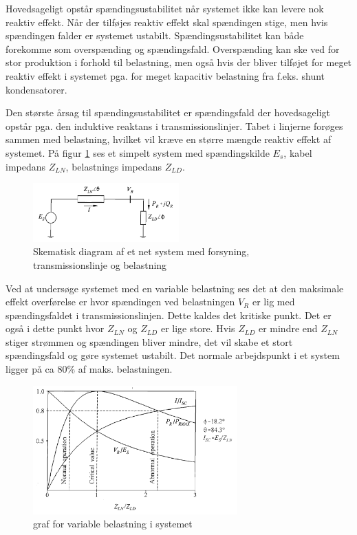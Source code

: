Hovedsageligt opstår spændingsustabilitet når systemet ikke kan levere nok reaktiv effekt. Når der tilføjes reaktiv effekt skal spændingen stige, men hvis spændingen falder er systemet ustabilt. Spændingsustabilitet kan både forekomme som overspænding og spændingsfald. Overspænding kan ske ved for stor produktion i forhold til belastning, men også hvis der bliver tilføjet for meget reaktiv effekt i systemet pga. for meget kapacitiv belastning fra f.eks. shunt kondensatorer. 

Den største årsag til spændingsustabilitet er spændingsfald der hovedsageligt opstår pga. den induktive reaktans i transmissionslinjer. Tabet i linjerne forøges sammen med belastning, hvilket vil kræve en større mængde reaktiv effekt af systemet. På figur \ref{fig:Voltage1} ses et simpelt system med spændingskilde $E_{s}$, kabel impedans $Z_{LN}$, belastnings impedans $Z_{LD}$. 


\begin{figure}[H] %
	\centering
	\includegraphics[width=0.5\textwidth]{figurer/Voltage_system}
	\caption{Skematisk diagram af et net system med forsyning, transmissionslinje og belastning}
	\label{fig:Voltage1}
\end{figure}

Ved at undersøge systemet med en variable belastning ses det at den maksimale effekt overførelse er hvor spændingen ved belastningen $V_{R}$ er lig med spændingsfaldet i transmissionslinjen. Dette kaldes det kritiske punkt. Det er også i dette punkt hvor $Z_{LN}$ og $Z_{LD}$ er lige store. Hvis $Z_{LD}$ er mindre end $Z_{LN}$ stiger strømmen og spændingen bliver mindre, det vil skabe et stort spændingsfald og gøre systemet ustabilt. Det normale arbejdspunkt i et system ligger på ca 80\% af maks. belastningen.

\begin{figure}[H] %
	\centering
	\includegraphics[width=0.7\textwidth]{figurer/Voltage_curve}
	\caption{graf for variable belastning i systemet}
	\label{fig:Voltage2}
\end{figure}


